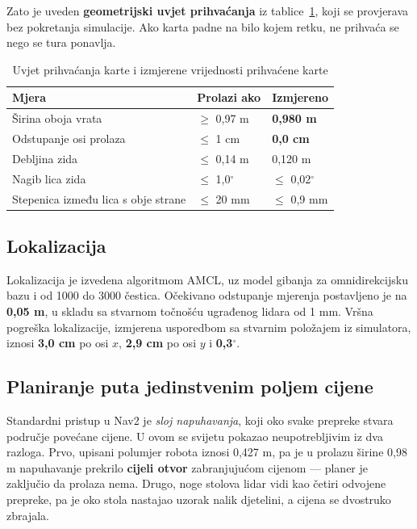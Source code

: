 \documentclass[12pt,a4paper]{article}
\begin{document}
Zato je uveden \textbf{geometrijski uvjet prihvaćanja} iz tablice~\ref{tab:gate}, koji se
provjerava bez pokretanja simulacije. Ako karta padne na bilo kojem retku, ne prihvaća se nego se
tura ponavlja.

\begin{table}[!htbp]
    \centering
    \caption{Uvjet prihvaćanja karte i izmjerene vrijednosti prihvaćene karte}
    \label{tab:gate}
    \scriptsize
    \begin{tabularx}{\textwidth}{@{}X l l@{}}
        \toprule
        \textbf{Mjera} & \textbf{Prolazi ako} & \textbf{Izmjereno} \\
        \midrule
        Širina oboja vrata                    & $\ge$ 0,97 m  & \textbf{0,980 m} \\
        Odstupanje osi prolaza                & $\le$ 1 cm    & \textbf{0,0 cm} \\
        Debljina zida                         & $\le$ 0,14 m  & 0,120 m \\
        Nagib lica zida                       & $\le$ 1,0$^\circ$ & $\le$ 0,02$^\circ$ \\
        Stepenica između lica s obje strane   & $\le$ 20 mm   & $\le$ 0,9 mm \\
        \bottomrule
    \end{tabularx}
\end{table}

\subsection{Lokalizacija}

Lokalizacija je izvedena algoritmom AMCL, uz model gibanja za omnidirekcijsku bazu i od 1000 do
3000 čestica. Očekivano odstupanje mjerenja postavljeno je na \textbf{0,05 m}, u skladu sa
stvarnom točnošću ugrađenog lidara od 1 mm. Vršna pogreška lokalizacije, izmjerena usporedbom sa stvarnim položajem iz
simulatora, iznosi \textbf{3,0 cm} po osi $x$, \textbf{2,9 cm} po osi $y$ i \textbf{0,3}$^\circ$.

\subsection{Planiranje puta jedinstvenim poljem cijene}

Standardni pristup u Nav2 je \textit{sloj napuhavanja}, koji oko svake prepreke stvara područje
povećane cijene. U ovom se svijetu pokazao neupotrebljivim iz dva razloga. Prvo, upisani polumjer
robota iznosi 0,427 m, pa je u prolazu širine 0,98 m napuhavanje prekrilo \textbf{cijeli otvor}
zabranjujućom cijenom --- planer je zaključio da prolaza nema. Drugo, noge stolova lidar vidi kao
četiri odvojene prepreke, pa je oko stola nastajao uzorak nalik djetelini, a cijena se dvostruko
zbrajala.
\end{document}
